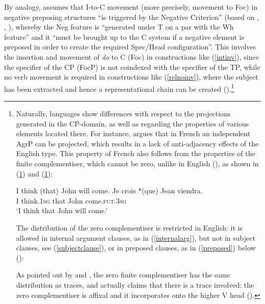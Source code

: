 By analogy, \citet[317]{rizzi1997} assumes that I-to-C movement (more precisely, movement to Foc) in negative preposing structures ``is triggered by the Negative Criterion'' (based on \citealt{rizzi1991}, \citealt{haegemanzanuttini1991}, \citealt{haegeman1995}), whereby the Neg feature is ``generated under T on a par with the Wh feature'' and it ``must be brought up to the C system if a negative element is preposed in order to create the required Spec/Head configuration''. This involves the insertion and movement of \textit{do} to C (Foc) in constructions like (\ref{intinv}), since the specifier of the CP (FocP) is not coindexed with the specifier of the TP, while no verb movement is required in constructions like (\ref{relnoinv}), where the subject has been extracted and hence a representational chain can be created (\citealt[317--318]{rizzi1997}).\footnote{Naturally, languages show differences with respect to the projections generated in the CP-domain, as well as regarding the properties of various elements located there. For instance, \citet[318--325]{rizzi1997} argues that in French an independent AgrP can be projected, which results in a lack of anti-adjacency effects of the English type. This property of French also follows from the properties of the finite complementiser, which cannot be zero, unlike in English (\citealt[320, ex. 114]{rizzi1997}), as shown in (\ref{englishzero}) and (\ref{frenchzero}):

\ea I think (that) John will come. \label{englishzero}
\ex \gll Je crois *(que) Jean viendra. \label{frenchzero}\\
I think.\textsc{1sg} \phantom{*(}that John come.\textsc{fut.3sg}\\
\glt `I think that John will come.'
\z

The distribution of the zero complementiser is restricted in English: it is allowed in internal argument clauses, as in (\ref{internalarg}), but not in subject clauses, see (\ref{subjectclause}), or in preposed clauses, as in (\ref{preposed}) below (\citealt[320, ex. 115]{rizzi1997}):

\z

As pointed out by \citet{kayne1984} and \citet{stowell1981diss}, the zero finite complementiser has the same distribution as traces, and \citet{pesetsky1995} actually claims that there is a trace involved: the zero complementiser is affixal and it incorporates onto the higher V head (\citealt[320]{rizzi1997}).}

